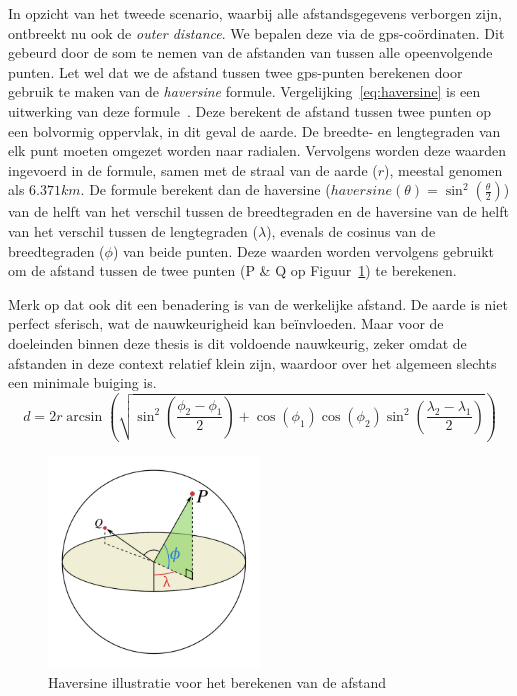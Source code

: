 In opzicht van het tweede scenario, waarbij alle afstandsgegevens verborgen
zijn, ontbreekt nu ook de \textit{outer distance}. We bepalen deze via de
\ac{gps}-coördinaten. Dit gebeurd door de som te nemen van de afstanden van
tussen alle opeenvolgende punten. Let wel dat we de afstand tussen twee
\ac{gps}-punten berekenen door gebruik te maken van de \textit{haversine}
formule. Vergelijking~\ref{eq:haversine} is een uitwerking van deze
formule~\cite{sheppard1922practical}. Deze berekent de afstand tussen twee
punten op een bolvormig oppervlak, in dit geval de aarde. De breedte- en
lengtegraden van elk punt moeten omgezet worden naar radialen. Vervolgens
worden deze waarden ingevoerd in de formule, samen met de straal van de aarde
($r$), meestal genomen als $6.371 km$. De formule berekent dan de haversine
($haversine(\theta)=\sin^2(\frac{\theta}{2})$) van de helft van het verschil
tussen de breedtegraden en de haversine van de helft van het verschil tussen de
lengtegraden ($\lambda$), evenals de cosinus van de breedtegraden ($\phi$) van
beide punten. Deze waarden worden vervolgens gebruikt om de afstand tussen de
twee punten (P \& Q op Figuur~\ref{fig:haversine}) te berekenen.

Merk op dat ook dit een benadering is van de werkelijke afstand. De aarde is
niet perfect sferisch, wat de nauwkeurigheid kan beïnvloeden. Maar voor de
doeleinden binnen deze thesis is dit voldoende nauwkeurig, zeker omdat de
afstanden in deze context relatief klein zijn, waardoor over het algemeen
slechts een minimale buiging is.
\begin{equation}\label{eq:haversine}
    d = 2r \arcsin\left(\sqrt{\sin^2\left(\frac{\phi_2-\phi_1}{2}\right)+\cos(\phi_1)\cos(\phi_2)\sin^2\left(\frac{\lambda_2-\lambda_1}{2}\right)}\right)
\end{equation}
\begin{figure}[h]
    \centering
    \includegraphics[width=0.5\textwidth]{fig/haversine.png}
    \caption{Haversine illustratie voor het berekenen van de afstand~\cite{Distance97:online}}\label{fig:haversine}
\end{figure}

